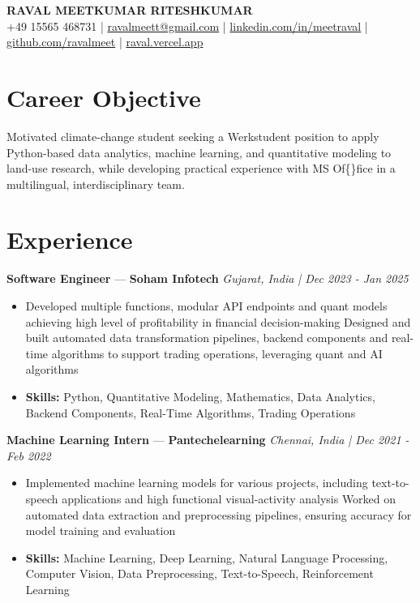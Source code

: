 \documentclass[a4paper,10pt]{article}
\begin{document}
\begin{center}
  {\Large\bfseries RAVAL MEETKUMAR RITESHKUMAR}\\[2pt]
  {\small +49 15565 468731 \;|\; \href{mailto:ravalmeett@gmail.com}{ravalmeett@gmail.com} \;|\; \href{https://www.linkedin.com/in/meetraval/}{linkedin.com/in/meetraval} \;|\; \href{https://github.com/ravalmeet}{github.com/ravalmeet} \;|\; \href{https://raval.vercel.app/}{raval.vercel.app}}
\end{center}
\vspace{-3pt}

\section*{Career Objective}
Motivated climate-change student seeking a Werkstudent position to apply Python-based data analytics, machine learning, and quantitative modeling to land-use research, while developing practical experience with MS Of\{\}fice in a multilingual, interdisciplinary team.\par

\section*{Experience}
\textbf{Software Engineer} — \textbf{Soham Infotech} \hfill \textit{Gujarat, India \;|\; Dec 2023 - Jan 2025}\par
\vspace{1pt}
\begin{itemize}
  \item Developed multiple functions, modular API endpoints and quant models achieving high level of profitability in financial decision-making Designed and built automated data transformation pipelines, backend components and real-time algorithms to support trading operations, leveraging quant and AI algorithms
  \item \textbf{Skills:} Python, Quantitative Modeling, Mathematics, Data Analytics, Backend Components, Real-Time Algorithms, Trading Operations
\end{itemize}
\vspace{3pt}
\textbf{Machine Learning Intern} — \textbf{Pantechelearning} \hfill \textit{Chennai, India \;|\; Dec 2021 - Feb 2022}\par
\vspace{1pt}
\begin{itemize}
  \item Implemented machine learning models for various projects, including text-to-speech applications and high functional visual-activity analysis Worked on automated data extraction and preprocessing pipelines, ensuring accuracy for model training and evaluation
  \item \textbf{Skills:} Machine Learning, Deep Learning, Natural Language Processing, Computer Vision, Data Preprocessing, Text-to-Speech, Reinforcement Learning
\end{itemize}
\end{document}
